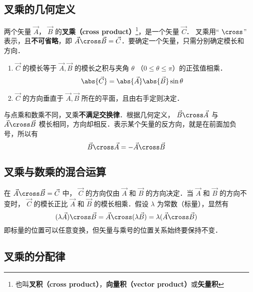 

\subsection{叉乘的几何定义}

两个矢量 $\vec A$，  $\vec B$ 的\textbf{叉乘（cross product）}\footnote{也叫\textbf{叉积（cross product）}，\textbf{向量积（vector product）}或\textbf{矢量积} }，是一个矢量 $\vec C$．  叉乘用“ $\cross$” 表示，且\textbf{不可省略}，即 $ \vec A \cross \vec B = \vec C$．要确定一个矢量，只需分别确定模长和方向．

\begin{enumerate}
\item $\vec C$ 的模长等于 $\vec A, \vec B$ 的模长之积与夹角 $\theta$ （$0\le\theta \le\pi$）的正弦值相乘．
\begin{equation}\label{Cross_eq1}
\abs {\vec C}  = \abs {\vec A} \abs {\vec B}  \sin \theta 
\end{equation}
\item $\vec C$ 的方向垂直于 $\vec A, \vec B$ 所在的平面，且由右手定则决定．
\end{enumerate}

与点乘和数乘不同，叉乘\textbf{不满足交换律}．根据几何定义， $\vec B \cross \vec A$ 与 $\vec A \cross \vec B$ 模长相同，方向却相反．表示某个矢量的反方向，就是在前面加负号，所以有
\begin{equation}\label{Cross_eq11}
\vec B \cross \vec A = -\vec A \cross \vec B
\end{equation}

\subsection{叉乘与数乘的混合运算}

在 $\vec A \cross \vec B = \vec C$ 中， $\vec C$ 的方向仅由 $\vec A$ 和 $\vec B$ 的方向决定．当 $\vec A$ 和 $\vec B$ 的方向不变时， $\vec C$ 的模长正比 $\vec A$ 和 $\vec B$ 的模长相乘．假设 $\lambda $ 为常数（标量），显然有
\begin{equation}
(\lambda \vec A) \cross \vec B = \vec A \cross (\lambda \vec B) = \lambda (\vec A \cross \vec B)
\end{equation}
即标量的位置可以任意变换，但矢量与乘号的位置关系始终要保持不变．

\subsection{叉乘的分配律}

